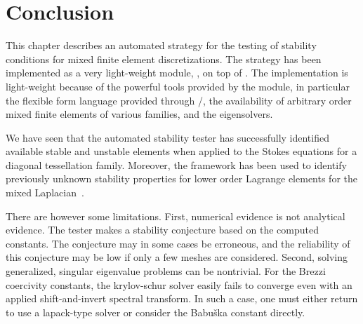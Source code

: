 \section{Conclusion}
\label{rognes:sec:conclusion}

This chapter describes an automated strategy for the testing of stability
conditions for mixed finite element discretizations. The strategy has
been implemented as a very light-weight \rognespython{} module,
\rognesascot{}, on top of \pydolfin{}. The implementation is
light-weight because of the powerful tools provided by the \pydolfin{}
module, in particular the flexible form language provided through
\ufl{}/\ffc{}, the availability of arbitrary order mixed finite
elements of various families, and the \slepc{} eigensolvers.

We have seen that the automated stability tester has successfully
identified available stable and unstable elements when applied to the
Stokes equations for a diagonal tessellation family. Moreover, the
framework has been used to identify previously unknown stability
properties for lower order Lagrange elements for the mixed
Laplacian~\cite{ArnoldRognes2009}.

There are however some limitations. First, numerical evidence is not
analytical evidence. The tester makes a stability conjecture based on
the computed constants. The conjecture may in some cases be erroneous,
and the reliability of this conjecture may be low if only a few meshes
are considered. Second, solving generalized, singular eigenvalue
problems can be nontrivial. For the Brezzi coercivity constants, the
krylov-schur solver easily fails to converge even with an applied
shift-and-invert spectral transform. In such a case, one must either
return to use a lapack-type solver or consider the Babu\v ska constant
directly.



